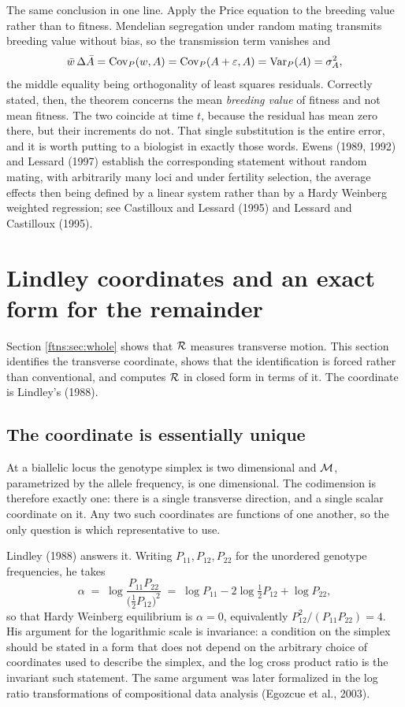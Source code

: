 \begin{remark}
\label{ftns:rem:price}
The same conclusion in one line. Apply the Price equation to the breeding value rather than to
fitness. Mendelian segregation under random mating transmits breeding value without bias, so the
transmission term vanishes and
\[
\bar{w}\,\Delta\bar A = \operatorname{Cov}_{P}(w,A) = \operatorname{Cov}_{P}(A+\varepsilon,A) = \operatorname{Var}_{P}(A) = \sigma^{2}_{A} ,
\]
the middle equality being orthogonality of least squares residuals. Correctly stated, then, the
theorem concerns the mean \emph{breeding value} of fitness and not mean fitness. The two coincide
at time $t$, because the residual has mean zero there, but their increments do not. That single
substitution is the entire error, and it is worth putting to a biologist in exactly those words.
Ewens (1989, 1992) and Lessard (1997) establish the corresponding statement without random mating,
with arbitrarily many loci and under fertility selection, the average effects then being defined by
a linear system rather than by a Hardy Weinberg weighted regression; see Castilloux and Lessard
(1995) and Lessard and Castilloux (1995).
\end{remark}

\section{Lindley coordinates and an exact form for the remainder}
\label{ftns:sec:lindley}

Section \ref{ftns:sec:whole} shows that $\mathcal{R}$ measures transverse motion. This section identifies the
transverse coordinate, shows that the identification is forced rather than conventional, and
computes $\mathcal{R}$ in closed form in terms of it. The coordinate is Lindley's (1988).

\subsection{The coordinate is essentially unique}

At a biallelic locus the genotype simplex is two dimensional and $\mathcal{M}$, parametrized by the allele
frequency, is one dimensional. The codimension is therefore exactly one: there is a single
transverse direction, and a single scalar coordinate on it. Any two such coordinates are functions
of one another, so the only question is which representative to use.

Lindley (1988) answers it. Writing $P_{11},P_{12},P_{22}$ for the unordered genotype frequencies,
he takes
\begin{equation}
\alpha \;=\; \log\frac{P_{11}P_{22}}{\big(\tfrac12P_{12}\big)^{2}}
\;=\; \log P_{11}-2\log\tfrac12 P_{12}+\log P_{22},
\label{ftns:eq:alpha}
\end{equation}
so that Hardy Weinberg equilibrium is $\alpha=0$, equivalently $P_{12}^2/(P_{11}P_{22})=4$. His
argument for the logarithmic scale is invariance: a condition on the simplex should be stated in a
form that does not depend on the arbitrary choice of coordinates used to describe the simplex, and
the log cross product ratio is the invariant such statement. The same argument was later formalized
in the log ratio transformations of compositional data analysis (Egozcue et al., 2003).

